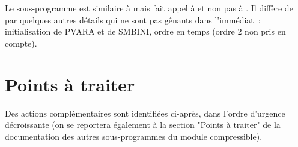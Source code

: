 Le sous-programme  est similaire à  mais fait appel
à  et non pas à .
Il diffère de  par quelques autres détails qui ne sont pas
gênants dans l'immédiat~:
initialisation de PVARA et de SMBINI,
ordre en temps (ordre 2 non pris en compte).

\newpage
\section*{Points à traiter}

Des actions complémentaires sont identifiées ci-après, dans l'ordre
d'urgence décroissante (on se reportera
également à la section "Points à traiter" de la documentation
des autres sous-programmes du module compressible).

